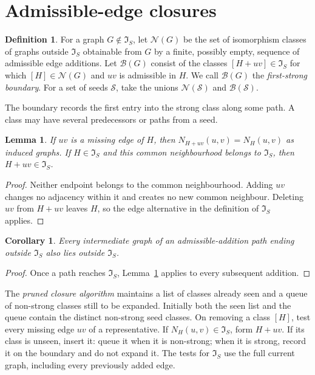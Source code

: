 \documentclass[11pt]{amsart}
\newcommand{\IS}{\mathfrak I_S}
\newcommand{\NS}{\mathcal N}
\newcommand{\BS}{\mathcal B}
\newtheorem{lemma}[theorem]{Lemma}
\newtheorem{corollary}[theorem]{Corollary}
\theoremstyle{definition}
\newtheorem{definition}[theorem]{Definition}
\begin{document}
\section{Admissible-edge closures}
\begin{definition}
For a graph $G\notin\IS$, let $\NS(G)$ be the set of isomorphism classes
of graphs outside $\IS$ obtainable from $G$ by a finite, possibly empty,
sequence of admissible edge additions. Let $\BS(G)$ consist of the classes $[H+uv]\in\IS$
for which $[H]\in\NS(G)$ and $uv$ is admissible in $H$.
We call $\BS(G)$ the \emph{first-strong boundary}.
For a set of seeds $\mathcal S$, take the unions
$\NS(\mathcal S)$ and $\BS(\mathcal S)$.
\end{definition}
The boundary records the first entry into the strong class along some
path. A class may have several predecessors or paths from a seed.

\begin{lemma}\label{lem:monotone}
If $uv$ is a missing edge of $H$, then
$N_{H+uv}(u,v)=N_H(u,v)$ as induced graphs.
If $H\in\IS$ and this common neighbourhood belongs to $\IS$,
then $H+uv\in\IS$.
\end{lemma}
\begin{proof}
Neither endpoint belongs to the common neighbourhood. Adding $uv$
changes no adjacency within it and creates no new common neighbour.
Deleting $uv$ from $H+uv$ leaves $H$, so the edge alternative in the
definition of $\IS$ applies.
\end{proof}
\begin{corollary}\label{cor:no-return}
Every intermediate graph of an admissible-addition path ending outside
$\IS$ also lies outside $\IS$.
\end{corollary}
\begin{proof}
Once a path reaches $\IS$, Lemma~\ref{lem:monotone} applies to every
subsequent addition.
\end{proof}

The \emph{pruned closure algorithm} maintains a list of classes already
seen and a queue of non-strong classes still to be expanded. Initially
both the seen list and the queue contain the distinct non-strong seed
classes. On removing a class $[H]$,
test every missing edge $uv$ of a representative. If $N_H(u,v)\in\IS$,
form $H+uv$. If its class is unseen, insert it: queue it when it is
non-strong; when it is strong, record it on the boundary and do not
expand it.
The tests for $\IS$ use the full current graph, including every
previously added edge.
\end{document}

